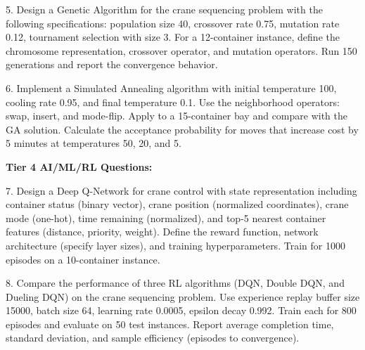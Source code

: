 \documentclass{article}
\begin{document}
5. Design a Genetic Algorithm for the crane sequencing problem with the following specifications: population size 40, crossover rate 0.75, mutation rate 0.12, tournament selection with size 3. For a 12-container instance, define the chromosome representation, crossover operator, and mutation operators. Run 150 generations and report the convergence behavior.

6. Implement a Simulated Annealing algorithm with initial temperature 100, cooling rate 0.95, and final temperature 0.1. Use the neighborhood operators: swap, insert, and mode-flip. Apply to a 15-container bay and compare with the GA solution. Calculate the acceptance probability for moves that increase cost by 5 minutes at temperatures 50, 20, and 5.

\textbf{Tier 4 AI/ML/RL Questions:}

7. Design a Deep Q-Network for crane control with state representation including container status (binary vector), crane position (normalized coordinates), crane mode (one-hot), time remaining (normalized), and top-5 nearest container features (distance, priority, weight). Define the reward function, network architecture (specify layer sizes), and training hyperparameters. Train for 1000 episodes on a 10-container instance.

8. Compare the performance of three RL algorithms (DQN, Double DQN, and Dueling DQN) on the crane sequencing problem. Use experience replay buffer size 15000, batch size 64, learning rate 0.0005, epsilon decay 0.992. Train each for 800 episodes and evaluate on 50 test instances. Report average completion time, standard deviation, and sample efficiency (episodes to convergence).
\end{document}
